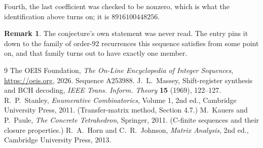 \documentclass[11pt,a4paper]{article}
\theoremstyle{plain}
\theoremstyle{definition}
\newtheorem{remark}[theorem]{Remark}
\begin{document}
Fourth, the last coefficient was checked to be nonzero, which is what the identification above
turns on; it is $8916100448256$.

\begin{remark}
The conjecture's own statement was never read. The entry pins it down to the family of
order-$92$ recurrences this sequence satisfies from some point on, and that family turns
out to have exactly one member.
\end{remark}

\begin{thebibliography}{9}
 The OEIS Foundation, \emph{The On-Line Encyclopedia of Integer
Sequences}, \url{https://oeis.org}, 2026. Sequence A253988.
 J.~L.~Massey, Shift-register synthesis and BCH decoding, \emph{IEEE
Trans. Inform. Theory} \textbf{15} (1969), 122--127.
 R.~P.~Stanley, \emph{Enumerative Combinatorics}, Volume 1, 2nd ed.,
Cambridge University Press, 2011. (Transfer-matrix method, Section 4.7.)
 M.~Kauers and P.~Paule, \emph{The Concrete Tetrahedron}, Springer, 2011.
(C-finite sequences and their closure properties.)
 R.~A.~Horn and C.~R.~Johnson, \emph{Matrix Analysis}, 2nd ed., Cambridge
University Press, 2013.
\end{thebibliography}
\end{document}
